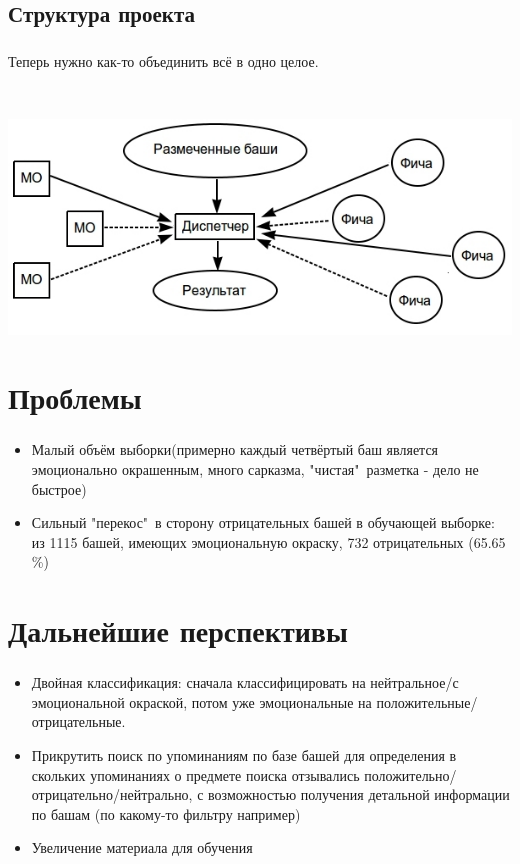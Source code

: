 \documentclass[t]{beamer}
\begin{document}
	\subsection{Структура проекта}
	\begin{frame}
		\frametitle{\insertsection}
		\framesubtitle{\insertsubsection}
		{Теперь нужно как-то объединить всё в одно целое.}\pause
		
		
		~
		
		\includegraphics[scale=0.52]{images/TheManager.jpg}
	\end{frame}	
	
	
	\section{Проблемы}
	
	\begin{frame}
		\frametitle{\insertsection}
		\begin{itemize}
			\item{Малый объём выборки(примерно каждый четвёртый баш является эмоционально окрашенным, много сарказма, "чистая"\ разметка - дело не быстрое)}\pause
			\item{Сильный "перекос"\ в сторону отрицательных башей в обучающей выборке: из 1115 башей, имеющих эмоциональную окраску, 732 отрицательных (65.65 \%)}
		\end{itemize}
	\end{frame}

	\section{Дальнейшие перспективы}
	\begin{frame}
		\frametitle{\insertsection}
		\begin{itemize}
			\item
			{Двойная классификация: сначала классифицировать на нейтральное/с эмоциональной окраской, потом уже эмоциональные на положительные/отрицательные. }\pause
			\item
			{Прикрутить поиск по упоминаниям по базе башей для определения в скольких упоминаниях о предмете поиска отзывались положительно/отрицательно/нейтрально, с возможностью получения детальной информации по башам (по какому-то фильтру например)}\pause
			\item
			Увеличение материала для обучения 
			
		\end{itemize}
		
	\end{frame}
		
\end{document}
